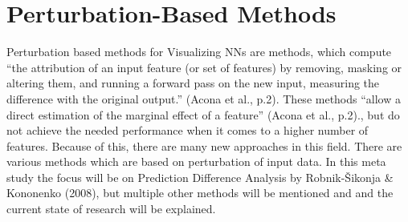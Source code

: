 \section{Perturbation-Based Methods}
Perturbation based methods for Visualizing NNs are methods, which compute “the attribution of an input feature (or set of features) by removing, masking or altering them, and running a forward pass on the new input, measuring the difference with the original output.” (Acona et al., p.2).
These methods “allow a direct estimation of the marginal effect of a feature” (Acona et al., p.2)., but do not achieve the needed performance when it comes to a higher number of features.
Because of this, there are many new approaches in this field.
There are various methods which are based on perturbation of input data. In this meta study the focus will be on Prediction Difference Analysis by Robnik-Šikonja & Kononenko (2008), but multiple other methods will be mentioned and and the current state of research will be explained.